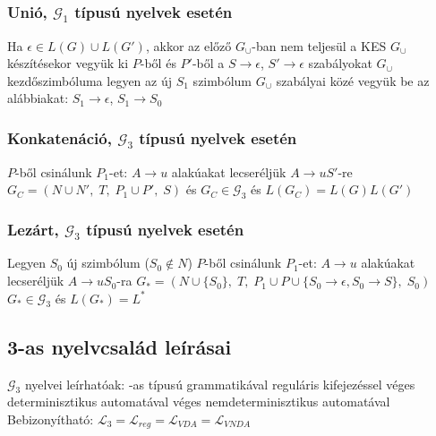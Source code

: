 \documentclass[12pt,a4paper]{article}
\begin{document}
\subsubsection{Unió, $\mathcal{G}_1$ típusú nyelvek esetén}

\begin{outline}
	\1 Ha $\epsilon \in L(G) \cup L(G')$, akkor az előző $G_\cup$-ban nem teljesül a KES
	\1 $G_\cup$ készítésekor vegyük ki $P$-ből és $P'$-ből a $S\to\epsilon$, $S'\to\epsilon$ szabályokat
	\1 $G_\cup$ kezdőszimbóluma legyen az új $S_1$ szimbólum
	\1 $G_\cup$ szabályai közé vegyük be az alábbiakat: $S_1\to\epsilon$, $S_1\to S_0$
\end{outline}

\subsubsection{Konkatenáció, $\mathcal{G}_3$ típusú nyelvek esetén}

\begin{outline}
	\1 $P$-ből csinálunk $P_1$-et: $A \to u$ alakúakat lecseréljük $A \to uS'$-re
	\1 $G_C = (N \cup N' ,\; T ,\; P_1 \cup P' ,\; S)$ és $G_C \in \mathcal{G}_3$ és $L(G_C) = L(G)L(G')$
\end{outline}

\subsubsection{Lezárt, $\mathcal{G}_3$ típusú nyelvek esetén}

\begin{outline}
	\1 Legyen $S_0$ új szimbólum ($S_0 \notin N$)
	\1 $P$-ből csinálunk $P_1$-et: $A \to u$ alakúakat lecseréljük $A \to uS_0$-ra
	\1 $G_* = (N \cup \{S_0\} ,\; T ,\; P_1 \cup P \cup \{S_0 \to \epsilon, S_0 \to S\} ,\; S_0)$
	\1 $G_* \in \mathcal{G}_3$ és $L(G_*) = L^*$
\end{outline}

\pagebreak

\subsection{3-as nyelvcsalád leírásai}

\begin{outline}
	\1 $\mathcal{G}_3$ nyelvei leírhatóak:
		-as típusú grammatikával
		\2 reguláris kifejezéssel
		\2 véges determinisztikus automatával
		\2 véges nemdeterminisztikus automatával
	\1 Bebizonyítható: $\mathcal{L}_3=\mathcal{L}_{reg}=\mathcal{L}_{VDA}=\mathcal{L}_{VNDA}$
\end{outline}
\end{document}
